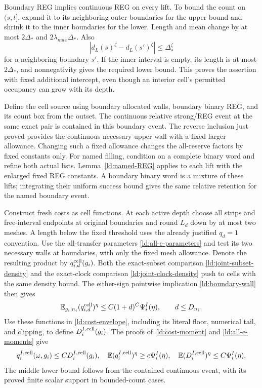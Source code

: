 Boundary REG implies continuous REG on every lift.  To bound the
count on \((s,t]\), expand it to its neighboring outer boundaries
for the upper bound and shrink it to the inner boundaries for the
lower.  Length and mean change by at most \(2\Delta_*\) and
\(2\lambda_{max}\Delta_*\).  Also
\[
 |d_L(s)^\zeta-d_L(s')^\zeta|\le\Delta_*^\zeta
\]
for a neighboring boundary \(s'\).  If the inner interval is
empty, its length is at most \(2\Delta_*\), and nonnegativity
gives the required lower bound.  This proves the assertion with
fixed additional intercept, even though an interior cell's permitted
occupancy can grow with its depth.

Define the cell source using boundary allocated walls, boundary
binary REG, and its count box from the outset.  The continuous
relative strong/REG event at the same exact pair is contained in
this boundary event.  The reverse inclusion just proved provides
the continuous necessary upper wall with a fixed larger allowance.
Changing such a fixed allowance changes the all-reserve factors by
fixed constants only.  For named filling, condition on a complete
binary word and refine both actual lists.  Lemma~\ref{ld:named-REG}
applies to each lift with the enlarged fixed REG constants.  A
boundary binary word is a mixture of these lifts; integrating their
uniform success bound gives the same relative retention for the
named boundary event.

Construct fresh costs as cell functions.  At each active depth choose
all strips and free-interval endpoints at original boundaries and
round \(L_d\) down by at most two meshes.  A length below the
fixed threshold uses the already justified \(q_d=1\) convention.
Use the all-transfer parameters \eqref{ld:all-e-parameters} and
test its two necessary walls at boundaries, with only the fixed
mesh allowance.  Denote the resulting product by
\(q_{i,d}^{\rm cell}(g_i)\).  Both the exact-subset comparison
\eqref{ld:joint-subset-density} and the exact-clock comparison
\eqref{ld:joint-clock-density} push to cells with the same density
bound.  The either-sign pointwise implication
\eqref{ld:boundary-wall} then gives
\[
 \mathbb E_{g_i\mid n_i}(q_{i,d}^{\rm cell})^\eta
       \le C(1+d)^C\Psi_i^I(\eta),\qquad d\le D_{n_i}.
\]
Use these functions in \eqref{ld:cost-envelope}, including its
literal floor, numerical tail, and clipping, to define
\(D_i^{I,\rm cell}(g_i)\).  The proofs of
\eqref{ld:cost-moment} and \eqref{ld:all-e-moments} give
\begin{equation}
 q_i^{I,\rm cell}(\omega,g_i)\le CD_i^{I,\rm cell}(g_i),\quad
 \mathbb E(q_i^{I,\rm cell})^\eta\ge c\Psi_i^I(\eta),\quad
 \mathbb E(D_i^{I,\rm cell})^\eta\le C\Psi_i^I(\eta).
 \label{ld:cell-local}
\end{equation}
The middle lower bound follows from the contained continuous event,
with its proved finite scalar support in bounded-count cases.

